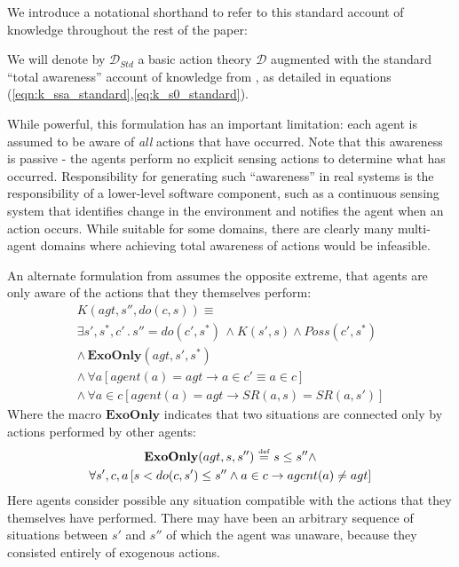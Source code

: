 \documentclass{ifaamas-submission}
\newcommand{\isdef}{\hbox{$\stackrel{\mbox{\tiny def}}{=}$}}
\begin{document}
We introduce a notational shorthand to refer to this standard account
of knowledge throughout the rest of the paper:

\begin{definition}%
We will denote by $\mathcal{D}_{Std}$ a basic action theory $\mathcal{D}$
augmented with the standard {}``total awareness'' account of knowledge
from \cite{scherl03sc_knowledge}, as detailed in equations (\ref{eqn:k_ssa_standard},\ref{eq:k_s0_standard}).
\end{definition}%
While powerful, this formulation has an important limitation: each
agent is assumed to be aware of \emph{all} actions that have occurred.
Note that this awareness is passive - the agents perform no explicit
sensing actions to determine what has occurred. Responsibility for
generating such {}``awareness'' in real systems is the responsibility
of a lower-level software component, such as a continuous sensing
system that identifies change in the environment and notifies the
agent when an action occurs. While suitable for some domains, there
are clearly many multi-agent domains where achieving total awareness
of actions would be infeasible.

An alternate formulation from \cite{Lesperance99sitcalc_approach}
assumes the opposite extreme, that agents are only aware of the actions
that they themselves perform:\begin{multline}
K(agt,s'',do(c,s))\equiv\\
\exists s',s^{*},c'\,.\, s''=do(c',s^{*})\,\wedge K(s',s)\wedge Poss(c',s^{*})\\
\wedge\,\mathbf{ExoOnly}(agt,s',s^{*})\\
\wedge\,\forall a\left[agent(a)=agt\rightarrow a\in c'\equiv a\in c\right]\\
\wedge\,\forall a\in c\left[agent(a)=agt\rightarrow SR(a,s)=SR(a,s')\right]\label{eqn:k_ssa_exo}\end{multline}
 Where the macro $\mathbf{ExoOnly}$ indicates that two situations
are connected only by actions performed by other agents:\begin{multline*}
\mathbf{ExoOnly}(agt,s,s'')\,\,\isdef\,\, s\leq s''\wedge\\
\forall s',c,a\left[s<do(c,s')\leq s''\wedge a\in c\rightarrow agent(a)\neq agt\right]\end{multline*}
 Here agents consider possible any situation compatible with the actions
that they themselves have performed. There may have been an arbitrary
sequence of situations between $s'$ and $s''$ of which the agent
was unaware, because they consisted entirely of exogenous actions.
\end{document}

